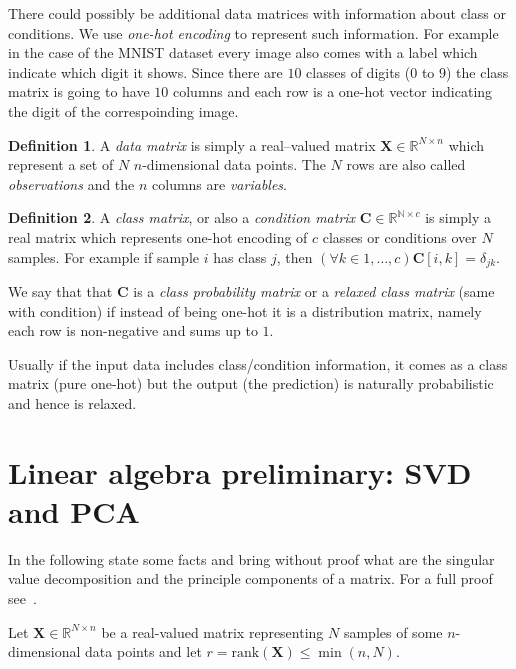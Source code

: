 \documentclass[11pt, a4paper]{report}
\theoremstyle{plain}
\theoremstyle{definition}
\newtheorem{mydef}{Definition}[chapter]
\theoremstyle{remark}
\newcommand{\N}{\mathbb{N}}
\newcommand{\R}{\mathbb{R}}
\newcommand{\bv}[1]{\boldsymbol{#1}}
\begin{document}
There could possibly be additional data matrices with information about
class or conditions. We use \emph{one-hot encoding} to represent such
information.
For example in the case of the MNIST dataset every image also comes with a label
which indicate which digit it shows. Since there are $10$ classes of digits ($0$
to $9$) the class matrix is going to have $10$ columns and each row is a one-hot
vector indicating the digit of the correspoinding image.

\begin{mydef}
\label{def:datamatrix}
A \emph{data matrix} is simply a real--valued matrix $\bv{X} \in \R^{N \times n}$
which represent a set of $N$ $n$-dimensional data points.
The $N$ rows are also called \emph{observations} and the $n$ columns are
\emph{variables}.
\end{mydef}

\begin{mydef}
\label{def:classmatrix}
A \emph{class matrix}, or also a \emph{condition matrix}
$\bv{C} \in \R^{\N \times c}$ is simply a real matrix which
represents one-hot encoding of $c$ classes or conditions over $N$ samples.
For example if sample $i$ has class $j$, then 
$(\forall k\in 1, \dots, c) \bv{C}[i,k] = \delta_{jk}$.

We say that that $\bv{C}$ is a \emph{class probability matrix} or a \emph{relaxed
class matrix} (same with condition)
if instead of being one-hot it is a distribution matrix, namely each row is
non-negative and sums up to $1$.
\end{mydef}

Usually if the input data includes class/condition information, it comes as a
class matrix (pure one-hot) but the output (the prediction) is naturally 
probabilistic and hence is relaxed.

\section{Linear algebra preliminary: SVD and PCA}
In the following state some facts and bring without proof what are the singular
value decomposition and the principle components of a matrix. For a
full proof see~\cite{serre2001matrices}.

Let $\bv{X} \in \R^{N \times n}$ be a real-valued matrix
representing $N$ samples of some
$n$-dimensional data points and let
$r= \text{rank}(\bv{X}) \leq \min(n,N)$. 
\end{document}
